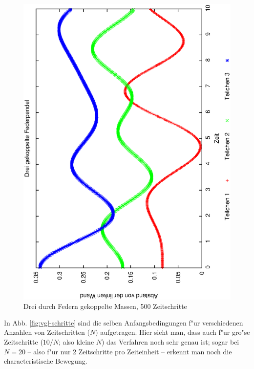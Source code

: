 \documentclass[a4paper,12pt]{article}
\begin{document}
\begin{figure}
  \centering
\includegraphics[width=\textwidth]{tranjektorie-federn01-1}
  \caption{Drei durch Federn gekoppelte Massen, 500 Zeitschritte}
  \label{fig:federn01}
\end{figure}
 
In Abb. \ref{fig:vgl-schritte} sind die selben Anfangsbedingungen f"ur
verschiedenen Anzahlen von Zeitschritten ($N$) aufgetragen. Hier sieht
man, dass auch f"ur gro"se Zeitschritte ($10/N$; also kleine $N$) das
Verfahren noch sehr genau ist; sogar bei $N=20$ -- also f"ur nur 2
Zeitschritte pro Zeiteinheit -- erkennt man noch die characteristische Bewegung.
\end{document}
